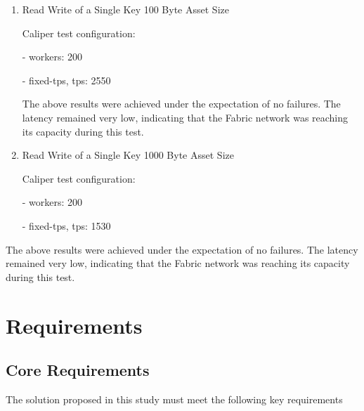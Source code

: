 \documentclass[conference]{IEEEtran}
\begin{document}
\begin{enumerate}[itemsep=2ex, parsep=1ex]
\begin{enumerate}[itemsep=2ex, parsep=1ex]
\begin{enumerate}[itemsep=2ex, parsep=1ex]
						\item Read Write of a Single Key 100 Byte Asset Size

							Caliper test configuration:

							- workers: 200

							- fixed-tps, tps: 2550

							The above results were achieved under the expectation of no failures.
							The latency remained very low, indicating that the Fabric network was
							reaching its capacity during this test.

						\item Read Write of a Single Key 1000 Byte Asset Size

							Caliper test configuration:

							- workers: 200

							- fixed-tps, tps: 1530
					\end{enumerate}
			\end{enumerate}

			The above results were achieved under the expectation of no failures. The
			latency remained very low, indicating that the Fabric network was reaching
			its capacity during this test.
	\end{enumerate}

	\section{Requirements}

	\subsection{Core Requirements}
	The solution proposed in this study must meet the following key requirements
\end{document}
